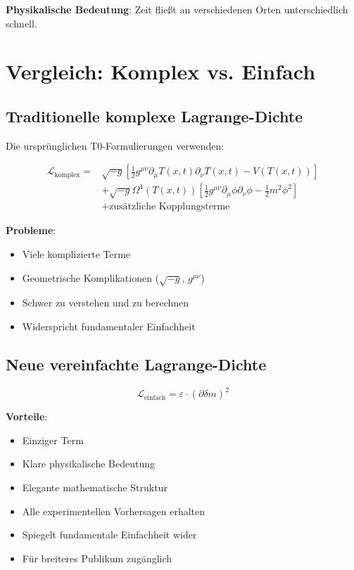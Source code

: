 \documentclass[12pt,a4paper]{article}
\newcommand{\Tfield}{T(x,t)}
\newcommand{\deltam}{\delta m}
\newcommand{\Lag}{\mathcal{L}}
\theoremstyle{definition}
\theoremstyle{remark}
\begin{document}
	\textbf{Physikalische Bedeutung}: Zeit fließt an verschiedenen Orten unterschiedlich schnell.
	
	\section{Vergleich: Komplex vs. Einfach}
	
	\subsection{Traditionelle komplexe Lagrange-Dichte}
	
	Die ursprünglichen T0-Formulierungen verwenden:
	
	\begin{align}
		\Lag_{\text{komplex}} = &\sqrt{-g} \left[\frac{1}{2} g^{\mu\nu} \partial_\mu \Tfield \partial_\nu \Tfield - V(\Tfield)\right] \\
		&+ \sqrt{-g} \Omega^4(\Tfield) \left[\frac{1}{2} g^{\mu\nu} \partial_\mu \phi \partial_\nu \phi - \frac{1}{2} m^2 \phi^2\right] \\
		&+ \text{zusätzliche Kopplungsterme}
	\end{align}
	
	\textbf{Probleme}:
	\begin{itemize}
		\item Viele komplizierte Terme
		\item Geometrische Komplikationen ($\sqrt{-g}$, $g^{\mu\nu}$)
		\item Schwer zu verstehen und zu berechnen
		\item Widerspricht fundamentaler Einfachheit
	\end{itemize}
	
	\subsection{Neue vereinfachte Lagrange-Dichte}
	
	\begin{equation}
		\boxed{\Lag_{\text{einfach}} = \varepsilon \cdot (\partial \deltam)^2}
	\end{equation}
	
	\textbf{Vorteile}:
	\begin{itemize}
		\item Einziger Term
		\item Klare physikalische Bedeutung
		\item Elegante mathematische Struktur
		\item Alle experimentellen Vorhersagen erhalten
		\item Spiegelt fundamentale Einfachheit wider
		\item Für breiteres Publikum zugänglich
	\end{itemize}
	
\end{document}
